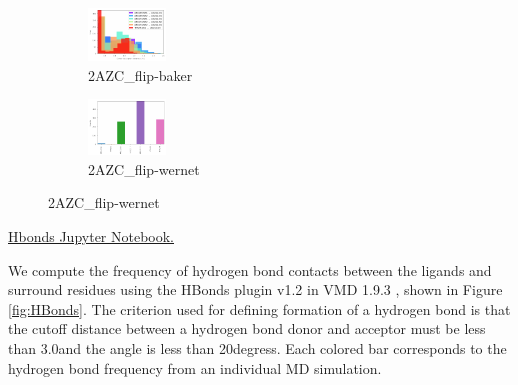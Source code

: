 \documentclass[fleqn,10pt]{wlscirep}
\newcommand{\angstrom}{\text{\normalfont\AA}}
\begin{document}
\begin{figure}[!ht]
\centering
\begin{subfigure}{.5\textwidth}
  \centering
  \includegraphics[width=.95\linewidth]{2AZC_flip/2AZC_flip-baker}
  \caption{2AZC_{flip}-baker}
  \label{fig:2AZC_flip-baker}
\end{subfigure}%
\begin{subfigure}{.5\textwidth}
  \centering
  \includegraphics[width=.95\linewidth]{2AZC_flip/2AZC_flip-wernet}
\caption{2AZC_{flip}-wernet}
\label{fig:2AZC_flip-wernet}
\end{subfigure}
\end{figure}

\href{https://github.com/nathanmlim/Spitale/blob/master/manual_md/notebooks/Hbonds.ipynb}{Hbonds Jupyter Notebook.}

We compute the frequency of hydrogen bond contacts between the ligands and surround residues using the HBonds plugin v1.2 \cite{} in VMD 1.9.3 \cite{}, shown in Figure \ref{fig:HBonds}.
The criterion used for defining formation of a hydrogen bond is that the cutoff distance between a hydrogen bond donor and acceptor must be less than 3.0\angstrom and the angle is less than 20degress.
Each colored bar corresponds to the hydrogen bond frequency from an individual MD simulation.
\end{document}
